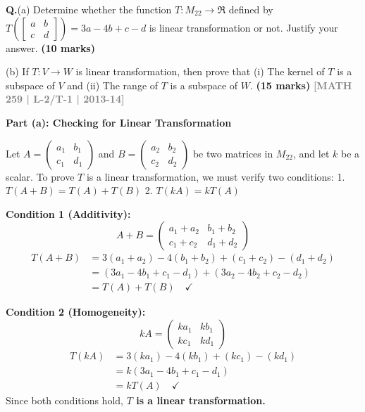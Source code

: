 \documentclass[12pt,a3paper]{article}
\newcommand{\yr}[1]{\hfill\textcolor{gray}{\small\textbf{[#1]}}}
\newcommand{\mk}[1]{\textcolor{orange!70!black}{\small\textbf{(#1 marks)}}}
\newcounter{qnum}
\newcommand{\Q}[1]{%
  \needspace{4\baselineskip}
  \refstepcounter{qnum}
  \vspace{6pt}
  \noindent\textbf{Q\theqnum.}\enspace #1\par
}
\begin{document}
\Q{(a) Determine whether the function 
$T : M_{22} \rightarrow \Re$ defined by $T\left(\begin{bmatrix} a & b \\ c & d \end{bmatrix}\right) = 3a - 4b + c - d$
is linear transformation or not. Justify your answer. \mk{10}

(b) If $T : V \rightarrow W$ is linear transformation, then prove that 
(i) The kernel of $T$ is a subspace of $V$ and (ii) The range of $T$ is a subspace of $W$. \mk{15}
\yr{MATH 259 | L-2/T-1 | 2013-14}
}

\begin{tcolorbox}[enhanced,breakable,colback=cF!4,colframe=cF,
  boxrule=0.8pt,arc=5pt,
  title={\textbf{Answer}},
  fonttitle=\bfseries\color{white},colbacktitle=cF]

\textbf{Part (a): Checking for Linear Transformation}

Let $A = \begin{pmatrix} a_1 & b_1 \\ c_1 & d_1 \end{pmatrix}$ and $B = \begin{pmatrix} a_2 & b_2 \\ c_2 & d_2 \end{pmatrix}$ be two matrices in $M_{22}$, and let $k$ be a scalar. 
To prove $T$ is a linear transformation, we must verify two conditions:
1. $T(A + B) = T(A) + T(B)$
2. $T(kA) = k T(A)$

\textbf{Condition 1 (Additivity):}
\[
A + B = \begin{pmatrix} a_1+a_2 & b_1+b_2 \\ c_1+c_2 & d_1+d_2 \end{pmatrix}
\]
\[
\begin{aligned}
T(A + B) &= 3(a_1+a_2) - 4(b_1+b_2) + (c_1+c_2) - (d_1+d_2) \\
         &= (3a_1 - 4b_1 + c_1 - d_1) + (3a_2 - 4b_2 + c_2 - d_2) \\
         &= T(A) + T(B) \quad \checkmark
\end{aligned}
\]

\textbf{Condition 2 (Homogeneity):}
\[
kA = \begin{pmatrix} ka_1 & kb_1 \\ kc_1 & kd_1 \end{pmatrix}
\]
\[
\begin{aligned}
T(kA) &= 3(ka_1) - 4(kb_1) + (kc_1) - (kd_1) \\
      &= k(3a_1 - 4b_1 + c_1 - d_1) \\
      &= k T(A) \quad \checkmark
\end{aligned}
\]
Since both conditions hold, \textbf{$T$ is a linear transformation.}


\end{tcolorbox}
\end{document}
